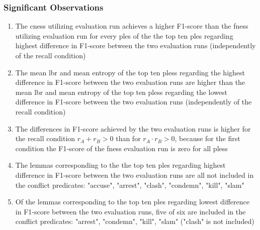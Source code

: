 \documentclass[11pt]{scrreprt}
\newcounter{listcounter}
\begin{document}
{\subsubsection{Significant Observations}
\begin{enumerate}[label=\arabic{listcounter}.\arabic*]
	\item The \gls{cness} utilizing evaluation run achieves a higher F1-score than the \gls{fness} utilizing evaluation run for every \gls{ples} of the the top ten \gls{ples} regarding highest difference in F1-score between the two evaluation runs (independently of the recall condition) \label{obs-itm:cness-higher-f1-for-highest-f1-difference}
	\item The mean \gls{lbr} and mean entropy of the top ten \gls{ples}s regarding the highest difference in F1-score between the two evaluation runs are higher than the mean \gls{lbr} and mean entropy of the top ten \gls{ples}s regarding the lowest difference in F1-score between the two evaluation runs (independently of the recall condition) \label{obs-itm:ples-more-diverse-for-highest-f1-difference}
	\item The differences in F1-score achieved by the two evaluation runs is higher for the recall condition \(r_A + r_B > 0\) than for \(r_A \cdot r_B > 0\), because for the first condition the F1-score of the \gls{fness} evaluation run is zero for all \gls{ples}s \label{obs-itm:fness-zero-recall-highest-f1-difference}
	\item The lemmas corresponding to the the top ten \gls{ples} regarding highest difference in F1-score between the two evaluation runs are all not included in the conflict predicates: "accuse", "arrest", "clash", "condemn", "kill", "slam" \label{obs-itm:conflict-verbs-not-in-highest-f1-difference}
	\item Of the lemmas corresponding to  the top ten \gls{ples} regarding lowest difference in F1-score between the two evaluation runs, five of six are included in the conflict predicates: "arrest", "condemn", "kill", "slam" ("clash" is not included) \label{obs-itm:conflict-verbs-in-lowest-f1-difference}



\end{enumerate}}
\end{document}
